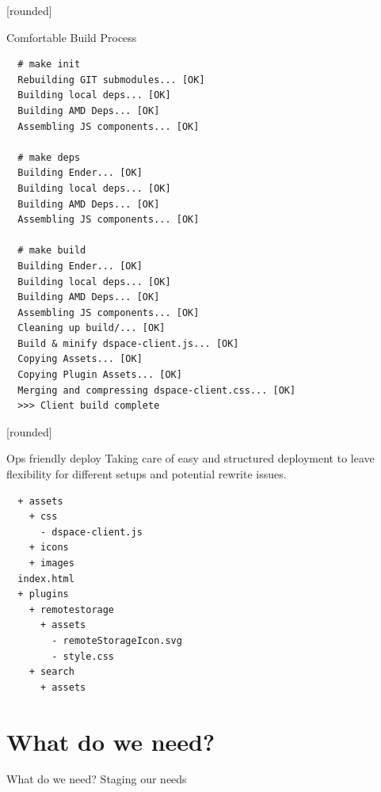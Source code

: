 \documentclass{beamer}
\newcommand\Fontvi{\fontsize{6}{7.2}\selectfont}
\begin{document}
[rounded]
\begin{frame}[fragile]{Comfortable Build Process}
\Fontvi
{}
\begin{block}{}
\begin{lstlisting}
  # make init
  Rebuilding GIT submodules... [OK]
  Building local deps... [OK]
  Building AMD Deps... [OK]
  Assembling JS components... [OK]

  # make deps
  Building Ender... [OK]
  Building local deps... [OK]
  Building AMD Deps... [OK]
  Assembling JS components... [OK]

  # make build
  Building Ender... [OK]
  Building local deps... [OK]
  Building AMD Deps... [OK]
  Assembling JS components... [OK]
  Cleaning up build/... [OK]
  Build & minify dspace-client.js... [OK]
  Copying Assets... [OK]
  Copying Plugin Assets... [OK]
  Merging and compressing dspace-client.css... [OK]
  >>> Client build complete
\end{lstlisting}
\end{block}
\end{frame}

[rounded]
\begin{frame}[fragile]{Ops friendly deploy}
Taking care of easy and structured deployment to leave flexibility for
different setups and potential rewrite issues.
\linebreak
\Fontvi
{}
\begin{block}{}
\begin{lstlisting}
  + assets
    + css
      - dspace-client.js
    + icons
    + images
  index.html
  + plugins
    + remotestorage
      + assets
        - remoteStorageIcon.svg
        - style.css
    + search
      + assets
\end{lstlisting}
\end{block}
\end{frame}



\section{What do we need?}

\begin{frame}{What do we need?}
 Staging our needs
\end{frame}
\end{document}
